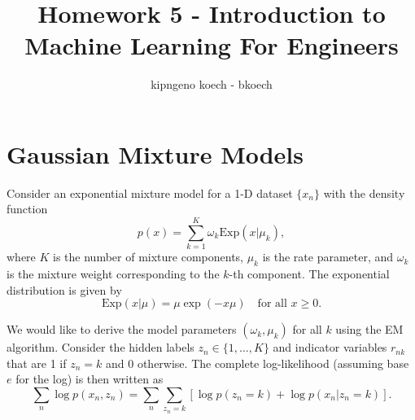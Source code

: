 \documentclass[a3paper,12pt]{extarticle} %
\begin{document}
\author{kipngeno koech - bkoech}
\title{Homework 5 - Introduction to Machine Learning For Engineers}   
\maketitle

\medskip

\maketitle
\section{Gaussian Mixture Models}
Consider an exponential mixture model for a 1-D dataset $\{x_n\}$ with the density function
\[
p(x) = \sum_{k=1}^K \omega_k \text{Exp}(x|\mu_k),
\]
where $K$ is the number of mixture components, $\mu_k$ is the rate parameter, and $\omega_k$ is the mixture weight corresponding to the $k$-th component. The exponential distribution is given by
\[
\text{Exp}(x|\mu) = \mu \exp(-x\mu) \quad \text{for all } x \geq 0. \tag{1}
\]

We would like to derive the model parameters $(\omega_k, \mu_k)$ for all $k$ using the EM algorithm. Consider the hidden labels $z_n \in \{1, \ldots, K\}$ and indicator variables $r_{nk}$ that are 1 if $z_n = k$ and 0 otherwise. The complete log-likelihood (assuming base $e$ for the log) is then written as
\[
\sum_n \log p(x_n, z_n) = \sum_n \sum_{z_n=k} \left[\log p(z_n = k) + \log p(x_n|z_n = k)\right].
\]
\end{document}
